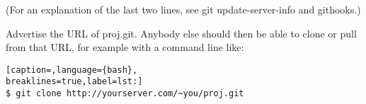 (For an explanation of the last two lines, see git update-server-info and
githooks.)

Advertise the URL of proj.git. Anybody else should then be able to clone or
pull from that URL, for example with a command line like:
\lstset{basicstyle=\scriptsize, numbers=none, captionpos=b, tabsize=4}
\begin{lstlisting}[caption=,language={bash},
breaklines=true,label=lst:]
$ git clone http://yourserver.com/~you/proj.git
\end{lstlisting}
